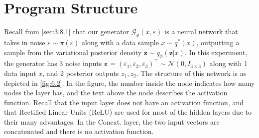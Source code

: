 \documentclass[honours,12pt, twoside]{unswthesis}
\numberwithin{equation}{section}
\theoremstyle{definition}
\begin{document}
\section{Program Structure}
Recall from \autoref{sec:3.8.1} that our generator $\mathcal{G}_\phi(x,\varepsilon)$ is a neural network that takes in noise $\varepsilon\sim \pi(\varepsilon)$ along with a data sample $x\sim q^*(x)$, outputting a sample from the variational posterior density $\bm{z}\sim q_\phi(\bm{z}|x)$. In this experiment, the generator has 3 noise inputs $\bm{\varepsilon}=(\varepsilon_1,\varepsilon_2,\varepsilon_3)^\top \sim \mathcal{N}(0,I_{3\times 3})$ along with 1 data input $x$, and 2 posterior outputs $z_1, z_2$. The structure of this network is as depicted in \autoref{fig:6.2}. In the figure, the number inside the node indicates how many nodes the layer has, and the text above the node describes the activation function. Recall that the input layer does not have an activation function, and that Rectified Linear Units (ReLU) are used for most of the hidden layers due to their many advantages. In the Concat. layer, the two input vectors are concatenated and there is no activation function.
\end{document}
